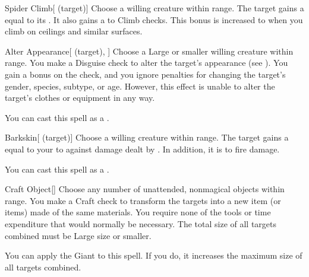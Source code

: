 \lowercase{\hypertarget{spell:Spider Climb}{}}\label{spell:Spider Climb}
\begin{attuneability}[\nth{1}]{\hypertarget{spell:Spider Climb}{Spider Climb}}[ (target)]
Choose a willing creature within \rngclose range.
The target gains a  equal to its .
It also gains a   to Climb checks.
This bonus is increased to  when you climb on ceilings and similar surfaces.
\end{attuneability}
\vspace{0.25em}



\lowercase{\hypertarget{spell:Alter Appearance}{}}\label{spell:Alter Appearance}
\begin{attuneability}[\nth{2}]{\hypertarget{spell:Alter Appearance}{Alter Appearance}}[ (target), ]
Choose a Large or smaller willing creature within \rngclose range.
You make a Disguise check to alter the target's appearance (see ).
You gain a  bonus on the check, and you ignore penalties for changing the target's gender, species, subtype, or age.
However, this effect is unable to alter the target's clothes or equipment in any way.

You can cast this spell as a .
\end{attuneability}
\vspace{0.25em}



\lowercase{\hypertarget{spell:Barkskin}{}}\label{spell:Barkskin}
\begin{attuneability}[\nth{2}]{\hypertarget{spell:Barkskin}{Barkskin}}[ (target)]
Choose a willing creature within \rngclose range.
The target gains a  equal to your  to  against damage dealt by .
In addition, it is  to fire damage.

You can cast this spell as a .
\end{attuneability}
\vspace{0.25em}



\lowercase{\hypertarget{spell:Craft Object}{}}\label{spell:Craft Object}
\begin{freeability}[\nth{3}]{\hypertarget{spell:Craft Object}{Craft Object}}[]
Choose any number of unattended, nonmagical objects within \rngclose range.
You make a Craft check to transform the targets into a new item (or items) made of the same materials.
You require none of the tools or time expenditure that would normally be necessary.
The total size of all targets combined must be Large size or smaller.

You can apply the Giant  to this spell.
If you do, it increases the maximum size of all targets combined.
\end{freeability}
\vspace{0.25em}



